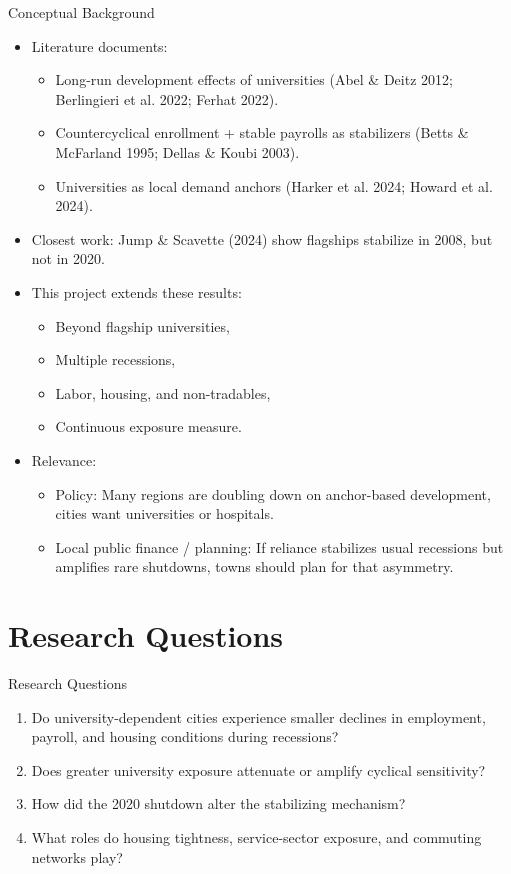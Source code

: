 \documentclass[10pt,compress]{beamer}
\begin{document}
\begin{frame}{Conceptual Background}
	\begin{itemize}
		\item Literature documents:
		\begin{itemize}
			\item Long-run development effects of universities (Abel \& Deitz 2012; Berlingieri et al. 2022; Ferhat 2022).
			\item Countercyclical enrollment + stable payrolls as stabilizers (Betts \& McFarland 1995; Dellas \& Koubi 2003).
			\item Universities as local demand anchors (Harker et al. 2024; Howard et al. 2024).
		\end{itemize}
		\item Closest work: Jump \& Scavette (2024) show flagships stabilize in 2008, but not in 2020.
		\item This project extends these results:
		\begin{itemize}
			\item Beyond flagship universities,
			\item Multiple recessions,
			\item Labor, housing, and non-tradables,
			\item Continuous exposure measure.
		\end{itemize}
		\item Relevance:
			\begin{itemize}
			\item Policy: Many regions are doubling down on anchor-based development, cities want universities or hospitals.
			\item Local public finance / planning: If reliance stabilizes usual recessions but amplifies rare shutdowns, towns should plan for that asymmetry.
			\end{itemize}
	\end{itemize}
\end{frame}

\section{Research Questions}

\begin{frame}{Research Questions}
	\begin{enumerate}
		\item Do university-dependent cities experience smaller declines in employment, payroll, and housing conditions during recessions?
		\item Does greater university exposure attenuate or amplify cyclical sensitivity?
		\item How did the 2020 shutdown alter the stabilizing mechanism?
		\item What roles do housing tightness, service-sector exposure, and commuting networks play?
	\end{enumerate}
\end{frame}
\end{document}

